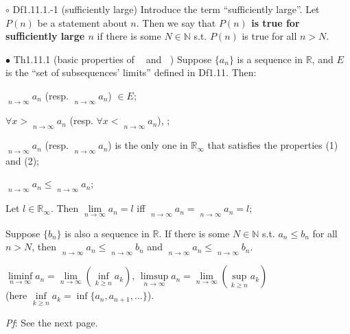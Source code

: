 \documentclass{article}
\begin{document}
\begin{Df}{$\circ$ Df1.11.1.-1 (sufficiently large)}
    Introduce the term ``sufficiently large''. Let $P(n)$ be a statement about $n$. Then we say that \textbf{$P(n)$ is true for sufficiently large $n$} if there is some $N\in\mathbb{N}$ s.t. $P(n)$ is true for all $n>N$. 
\end{Df}

\begin{Th}{$\bullet$ Th1.11.1 (basic properties of $\mathop{\overline{\lim}}$ and $\mathop{\underline{\lim}}$)}
    Suppose $\{a_n\}$ is a sequence in $\mathbb{R}$, and $E$ is the ``set of subsequences' limits'' defined in Df1.11. Then:
    \begin{compactenum}
        \item $\mathop{\overline{\lim}}\limits_{n\to\infty}a_n$ (resp. $\mathop{\underline{\lim}}\limits_{n\to\infty}a_n$) $\in E$;
        \item $\forall x>\mathop{\overline{\lim}}\limits_{n\to\infty}a_n$ (resp. $\forall x<\mathop{\underline{\lim}}\limits_{n\to\infty}a_n$), ;
        \item $\mathop{\overline{\lim}}\limits_{n\to\infty}a_n$ (resp. $\mathop{\underline{\lim}}\limits_{n\to\infty}a_n$) is the only one in $\mathbb{R}_\infty$ that satisfies the properties (1) and (2);
        \item $\mathop{\underline{\lim}}\limits_{n\to\infty}a_n \leq \mathop{\overline{\lim}}\limits_{n\to\infty}a_n$;
        \item Let $l\in\mathbb{R}_\infty$. Then $\lim\limits_{n\to\infty}a_n=l$ iff $\mathop{\overline{\lim}}\limits_{n\to\infty}a_n=\mathop{\underline{\lim}}\limits_{n\to\infty}a_n=l$;
        \item Suppose $\{b_n\}$ is also a sequence in $\mathbb{R}$. If there is some $N\in\mathbb{N}$ s.t. $a_n\leq b_n$ for all $n>N$, then $\mathop{\underline{\lim}}\limits_{n\to\infty}a_n\leq \mathop{\underline{\lim}}\limits_{n\to\infty}b_n$ and $\mathop{\overline{\lim}}\limits_{n\to\infty}a_n\leq \mathop{\overline{\lim}}\limits_{n\to\infty}b_n$.
        \item $\liminf\limits_{n\to\infty}a_n = \lim\limits_{n\to\infty}\left(\inf\limits_{k\geq n}a_k\right)$, $\limsup\limits_{n\to\infty}a_n = \lim\limits_{n\to\infty}\left(\sup\limits_{k\geq n}a_k\right)$ \\
        (here $\inf\limits_{k\geq n}a_k = \inf\{a_n, a_{n+1}, \dots\}$).
    \end{compactenum}
    \tcblower
    \textit{Pf}: See the next page.
\end{Th}
\end{document}
